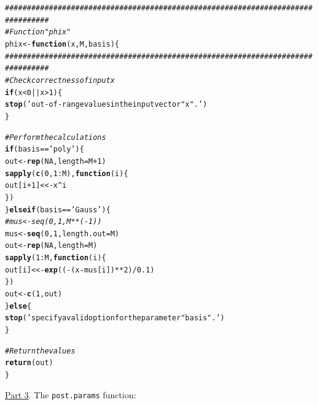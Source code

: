 \documentclass[a4paper, 11pt]{article}\usepackage[]{graphicx}\usepackage[]{color}
\makeatletter
\newcommand{\hlnum}[1]{\textcolor[rgb]{0.686,0.059,0.569}{#1}}%
\newcommand{\hlstr}[1]{\textcolor[rgb]{0.192,0.494,0.8}{#1}}%
\newcommand{\hlcom}[1]{\textcolor[rgb]{0.678,0.584,0.686}{\textit{#1}}}%
\newcommand{\hlopt}[1]{\textcolor[rgb]{0,0,0}{#1}}%
\newcommand{\hlstd}[1]{\textcolor[rgb]{0.345,0.345,0.345}{#1}}%
\newcommand{\hlkwa}[1]{\textcolor[rgb]{0.161,0.373,0.58}{\textbf{#1}}}%
\newcommand{\hlkwb}[1]{\textcolor[rgb]{0.69,0.353,0.396}{#1}}%
\newcommand{\hlkwc}[1]{\textcolor[rgb]{0.333,0.667,0.333}{#1}}%
\newcommand{\hlkwd}[1]{\textcolor[rgb]{0.737,0.353,0.396}{\textbf{#1}}}%
\newenvironment{kframe}{%
 \def\at@end@of@kframe{}%
 \ifinner\ifhmode%
  \def\at@end@of@kframe{\end{minipage}}%
  \begin{minipage}{\columnwidth}%
 \fi\fi%
 \def\FrameCommand##1{\hskip\@totalleftmargin \hskip-\fboxsep
 \colorbox{shadecolor}{##1}\hskip-\fboxsep
     \hskip-\linewidth \hskip-\@totalleftmargin \hskip\columnwidth}%
 \MakeFramed {\advance\hsize-\width
   \@totalleftmargin\z@ \linewidth\hsize
   \@setminipage}}%
 {\par\unskip\endMakeFramed%
 \at@end@of@kframe}
\newenvironment{knitrout}{}{} %
\makeatother
\begin{document}
\begin{knitrout}\small
{}\color{fgcolor}\begin{kframe}
\begin{alltt}
\hlcom{################################################################################}
\hlcom{# Function "phix"}
\hlstd{phix} \hlkwb{<-} \hlkwa{function}\hlstd{(}\hlkwc{x}\hlstd{,} \hlkwc{M}\hlstd{,} \hlkwc{basis}\hlstd{) \{}
\hlcom{################################################################################}
  \hlcom{# Check correctness of input x}
  \hlkwa{if} \hlstd{(x} \hlopt{<} \hlnum{0} \hlopt{||} \hlstd{x} \hlopt{>} \hlnum{1}\hlstd{) \{}
    \hlkwd{stop}\hlstd{(}\hlstr{'out-of-range values in the input vector "x".'}\hlstd{)}
  \hlstd{\}}

  \hlcom{# Perform the calculations  }
  \hlkwa{if} \hlstd{(basis} \hlopt{==} \hlstr{'poly'}\hlstd{) \{}
    \hlstd{out} \hlkwb{<-} \hlkwd{rep}\hlstd{(}\hlnum{NA}\hlstd{,} \hlkwc{length} \hlstd{= M} \hlopt{+} \hlnum{1}\hlstd{)}
    \hlkwd{sapply}\hlstd{(}\hlkwd{c}\hlstd{(}\hlnum{0}\hlstd{,} \hlnum{1}\hlopt{:}\hlstd{M),} \hlkwa{function}\hlstd{(}\hlkwc{i}\hlstd{) \{}
      \hlstd{out[i} \hlopt{+} \hlnum{1}\hlstd{]} \hlkwb{<<-} \hlstd{x}\hlopt{^}\hlstd{i}
    \hlstd{\})}
  \hlstd{\}} \hlkwa{else if} \hlstd{(basis} \hlopt{==} \hlstr{'Gauss'}\hlstd{) \{}
    \hlcom{#mus <- seq(0, 1, M ** (-1))}
    \hlstd{mus} \hlkwb{<-} \hlkwd{seq}\hlstd{(}\hlnum{0}\hlstd{,} \hlnum{1}\hlstd{,} \hlkwc{length.out} \hlstd{= M)}
    \hlstd{out} \hlkwb{<-} \hlkwd{rep}\hlstd{(}\hlnum{NA}\hlstd{,} \hlkwc{length} \hlstd{= M)}
    \hlkwd{sapply}\hlstd{(}\hlnum{1}\hlopt{:}\hlstd{M,} \hlkwa{function}\hlstd{(}\hlkwc{i}\hlstd{) \{}
      \hlstd{out[i]} \hlkwb{<<-} \hlkwd{exp}\hlstd{((}\hlopt{-}\hlstd{(x} \hlopt{-} \hlstd{mus[i])} \hlopt{**} \hlnum{2}\hlstd{)} \hlopt{/} \hlnum{0.1}\hlstd{)}
    \hlstd{\})}
    \hlstd{out} \hlkwb{<-} \hlkwd{c}\hlstd{(}\hlnum{1}\hlstd{, out)}
  \hlstd{\}} \hlkwa{else} \hlstd{\{}
    \hlkwd{stop}\hlstd{(}\hlstr{'specify a valid option for the parameter "basis".'}\hlstd{)}
  \hlstd{\}}

  \hlcom{# Return the values}
  \hlkwd{return}\hlstd{(out)}
\hlstd{\}}
\end{alltt}
\end{kframe}
\end{knitrout}
\underline{Part 3}. The \texttt{post.params} function:
\end{document}
